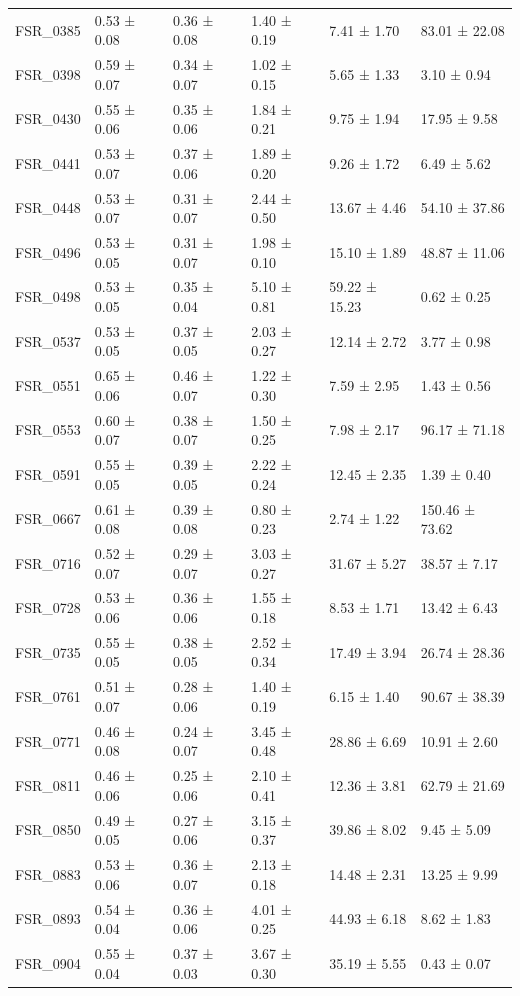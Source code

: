 \begin{tabular}{llllll}
FSR_0385 & 0.53 ± 0.08 & 0.36 ± 0.08 & 1.40 ± 0.19 & 7.41 ± 1.70 & 83.01 ± 22.08 \\
FSR_0398 & 0.59 ± 0.07 & 0.34 ± 0.07 & 1.02 ± 0.15 & 5.65 ± 1.33 & 3.10 ± 0.94 \\
FSR_0430 & 0.55 ± 0.06 & 0.35 ± 0.06 & 1.84 ± 0.21 & 9.75 ± 1.94 & 17.95 ± 9.58 \\
FSR_0441 & 0.53 ± 0.07 & 0.37 ± 0.06 & 1.89 ± 0.20 & 9.26 ± 1.72 & 6.49 ± 5.62 \\
FSR_0448 & 0.53 ± 0.07 & 0.31 ± 0.07 & 2.44 ± 0.50 & 13.67 ± 4.46 & 54.10 ± 37.86 \\
FSR_0496 & 0.53 ± 0.05 & 0.31 ± 0.07 & 1.98 ± 0.10 & 15.10 ± 1.89 & 48.87 ± 11.06 \\
FSR_0498 & 0.53 ± 0.05 & 0.35 ± 0.04 & 5.10 ± 0.81 & 59.22 ± 15.23 & 0.62 ± 0.25 \\
FSR_0537 & 0.53 ± 0.05 & 0.37 ± 0.05 & 2.03 ± 0.27 & 12.14 ± 2.72 & 3.77 ± 0.98 \\
FSR_0551 & 0.65 ± 0.06 & 0.46 ± 0.07 & 1.22 ± 0.30 & 7.59 ± 2.95 & 1.43 ± 0.56 \\
FSR_0553 & 0.60 ± 0.07 & 0.38 ± 0.07 & 1.50 ± 0.25 & 7.98 ± 2.17 & 96.17 ± 71.18 \\
FSR_0591 & 0.55 ± 0.05 & 0.39 ± 0.05 & 2.22 ± 0.24 & 12.45 ± 2.35 & 1.39 ± 0.40 \\
FSR_0667 & 0.61 ± 0.08 & 0.39 ± 0.08 & 0.80 ± 0.23 & 2.74 ± 1.22 & 150.46 ± 73.62 \\
FSR_0716 & 0.52 ± 0.07 & 0.29 ± 0.07 & 3.03 ± 0.27 & 31.67 ± 5.27 & 38.57 ± 7.17 \\
FSR_0728 & 0.53 ± 0.06 & 0.36 ± 0.06 & 1.55 ± 0.18 & 8.53 ± 1.71 & 13.42 ± 6.43 \\
FSR_0735 & 0.55 ± 0.05 & 0.38 ± 0.05 & 2.52 ± 0.34 & 17.49 ± 3.94 & 26.74 ± 28.36 \\
FSR_0761 & 0.51 ± 0.07 & 0.28 ± 0.06 & 1.40 ± 0.19 & 6.15 ± 1.40 & 90.67 ± 38.39 \\
FSR_0771 & 0.46 ± 0.08 & 0.24 ± 0.07 & 3.45 ± 0.48 & 28.86 ± 6.69 & 10.91 ± 2.60 \\
FSR_0811 & 0.46 ± 0.06 & 0.25 ± 0.06 & 2.10 ± 0.41 & 12.36 ± 3.81 & 62.79 ± 21.69 \\
FSR_0850 & 0.49 ± 0.05 & 0.27 ± 0.06 & 3.15 ± 0.37 & 39.86 ± 8.02 & 9.45 ± 5.09 \\
FSR_0883 & 0.53 ± 0.06 & 0.36 ± 0.07 & 2.13 ± 0.18 & 14.48 ± 2.31 & 13.25 ± 9.99 \\
FSR_0893 & 0.54 ± 0.04 & 0.36 ± 0.06 & 4.01 ± 0.25 & 44.93 ± 6.18 & 8.62 ± 1.83 \\
FSR_0904 & 0.55 ± 0.04 & 0.37 ± 0.03 & 3.67 ± 0.30 & 35.19 ± 5.55 & 0.43 ± 0.07 \\

\end{tabular}
